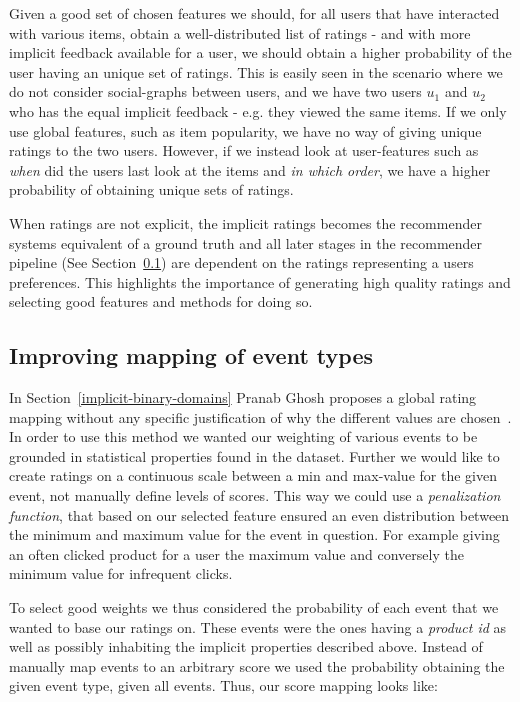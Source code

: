 Given a good set of chosen features we should, for all users that have
interacted with various items, obtain a well-distributed list of ratings - and
with more implicit feedback available for a user, we should obtain a higher
probability of the user having an unique set of ratings. This is easily seen in
the scenario where we do not consider social-graphs between users, and we have
two users $u_1$ and $u_2$ who has the equal implicit feedback - e.g. they
viewed the same items. If we only use global features, such as item popularity,
we have no way of giving unique ratings to the two users. However, if we
instead look at user-features such as \textit{when} did the users last look at
the items and \textit{in which order}, we have a higher probability of
obtaining unique sets of ratings.

When ratings are not explicit, the implicit ratings becomes the recommender
systems equivalent of a ground truth and all later stages in the recommender
pipeline (See Section~\ref{}) are dependent on the ratings representing a users
preferences. This highlights the importance of generating high quality ratings
and selecting good features and methods for doing so.

\subsection{Improving mapping of event types}

In Section~\ref{implicit-binary-domains} Pranab Ghosh proposes a global rating
mapping without any specific justification of why the different values are
chosen~\cite{pkghost2014implicit}. In order to use this method we wanted our
weighting of various events to be grounded in statistical properties found in
the dataset. Further we would like to create ratings on a continuous scale
between a min and max-value for the given event, not manually define levels of
scores. This way we could use a \textit{penalization function}, that based on
our selected feature ensured an even distribution between the minimum and
maximum value for the event in question. For example giving an often clicked
product for a user the maximum value and conversely the minimum value for
infrequent clicks.

To select good weights we thus considered the probability of each event that we
wanted to base our ratings on. These events were the ones having a
\textit{product id} as well as possibly inhabiting the implicit properties
described above. Instead of manually map events to an arbitrary score we used
the probability obtaining the given event type, given all events. Thus, our
score mapping looks like:

